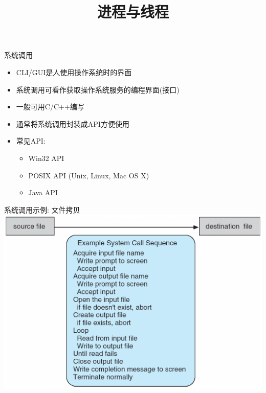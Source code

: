 \documentclass[xcolor=svgnames]{beamer}
\begin{document}
\begin{CJK*}{UTF8}{gbsn}


\title{进程与线程}


\begin{frame}{系统调用}
\begin{itemize}
\item CLI/GUI是人使用操作系统时的界面
\item 系统调用可看作获取操作系统服务的编程界面(接口)
\item 一般可用C/C++编写
\item 通常将系统调用封装成API方便使用
\item 常见API:
\begin{itemize}
\item Win32 API
\item POSIX API (Unix, Linux, Mac OS X)
\item Java API
\end{itemize}
\end{itemize}
\end{frame}

\begin{frame}{系统调用示例: 文件拷贝}
\includegraphics[width=1.0\textwidth]{syscall.png}
\end{frame}


\end{CJK*}
\end{document}
